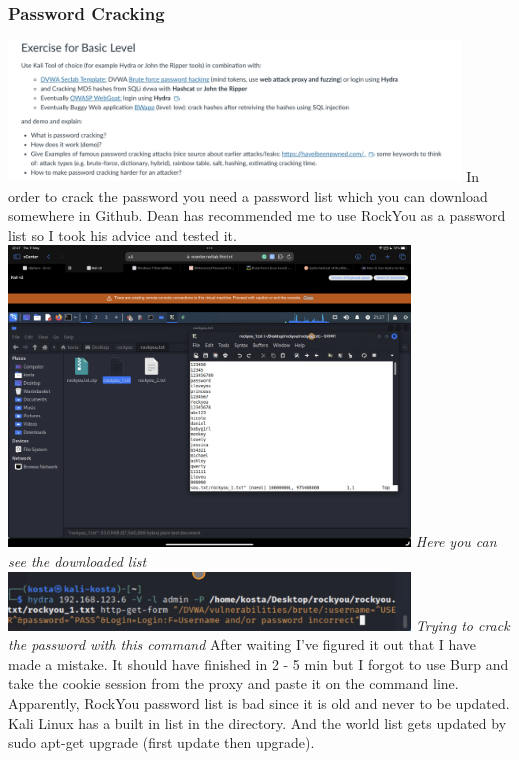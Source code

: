 \documentclass[12pt, letterpaper]{article}
\begin{document}
\subsubsection{Password Cracking}
\includegraphics[width=0.9\textwidth]{fotos/Week 9/Password cracking/IMG_0766.jpeg}
\hfill\break
\hfill\break
In order to crack the password you need a password list which you can download somewhere in Github. Dean has recommended me to use RockYou as a password list so I took his advice and tested it.
\hfill\break
\includegraphics[width=0.8\textwidth]{fotos/Week 9/Password cracking/Rockyou.png}
\break
\emph{Here you can see the downloaded list}
\hfill\break
\hfill\break
\includegraphics[width=0.8\textwidth]{fotos/Week 9/Password cracking/Code.jpeg}
\break
\emph{Trying to crack the password with this command}
\hfill\break
\hfill\break
After waiting I've figured it out that I have made a mistake. It should have finished in 2 - 5 min but I forgot to use Burp and take the cookie session from the proxy and paste it on the command line. Apparently, RockYou password list is bad since it is old and never to be updated. Kali Linux has a built in list in the directory. And the world list gets updated by sudo apt-get upgrade (first update then upgrade).
\end{document}
